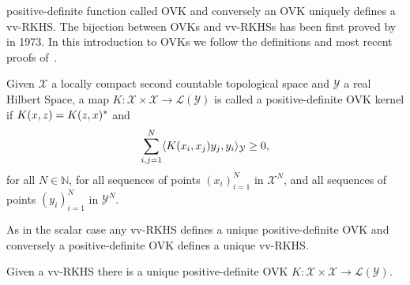 \documentclass[twoside,11pt]{article}
\begin{document}
po\-si\-ti\-ve-de\-fi\-ni\-te function called \acf{OVK} and conversely an
\ac{OVK} uniquely defines a \ac{vv-RKHS}. The bijection between \acsp{OVK} and
\acsp{vv-RKHS} has been first proved by~\citet{Senkene73} in 1973. In this
introduction to \acsp{OVK} we follow the definitions and most recent proofs
of~\citet{Carmeli2010}.
\begin{definition}
    \label{def:reproducing_kernel_real} Given $\mathcal{X}$ a locally compact
    second countable topological space and $\mathcal{Y}$ a real Hilbert Space,
    a map $K:\mathcal{X}\times\mathcal{X}\to\mathcal{L}(\mathcal{Y})$ is called
    a positive-definite \acl{OVK} kernel if $K(x,z)=K(z,x)^*$ and
    \begin{dmath}
        \sum_{i,j=1}^N\inner{K(x_i,x_j)y_j,y_i}_{\mathcal{Y}}\ge 0,
    \end{dmath}
    for all $N\in\mathbb{N}$, for all sequences of points $(x_i)_{i=1}^N$ in
    $\mathcal{X}^N$, and all sequences of points  $(y_i)_{i=1}^N$ in
    $\mathcal{Y}^N$. \label{def:ovk_real}
\end{definition}
As in the scalar case any \acl{vv-RKHS} defines a unique positive-definite
\acl{OVK} and conversely a positive-definite \acl{OVK} defines a unique
\acl{vv-RKHS}.
\begin{proposition}
    \label{pr:unique_rkhs} Given a \acl{vv-RKHS} there is a unique
    positive-definite \acl{OVK}
    $K:\mathcal{X}\times\mathcal{X}\to\mathcal{L}(\mathcal{Y})$.
\end{proposition}
\end{document}
